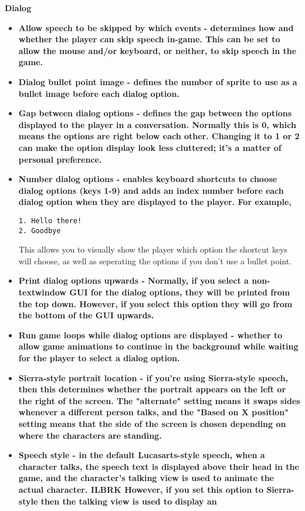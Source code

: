 \bf{Dialog}
\begin{itemize}
\item \bf{Allow speech to be skipped by which events} - determines how and whether the player can skip speech
in-game. This can be set to allow the mouse and/or keyboard, or neither, to
skip speech in the game.
\item \bf{Dialog bullet point image} - defines the number of sprite to use as a bullet image before each dialog option.
\item \bf{Gap between dialog options} - defines the gap between the options displayed
to the player in a conversation. Normally this is 0, which means the
options are right below each other. Changing it to 1 or 2 can make the
option display look less cluttered; it's a matter of personal preference.
\item \bf{Number dialog options} - enables keyboard shortcuts to choose dialog options (keys 1-9) and adds an index number before each dialog option when
they are displayed to the player. For example,
\begin{verbatim}
1. Hello there!
2. Goodbye
\end{verbatim}
This allows you to visually show the player which option the shortcut keys will choose,
as well as seperating the options if you don't use a bullet point.
\item \bf{Print dialog options upwards} - Normally, if you select a non-textwindow GUI
for the dialog options, they will be printed from the top down. However, if you select this
option they will go from the bottom of the GUI upwards.
\item \bf{Run game loops while dialog options are displayed} - whether to allow game animations to continue in the background while waiting for the player to select a dialog option.
\item \bf{Sierra-style portrait location} - if you're using Sierra-style speech, then this
determines whether the portrait appears on the left or the right of the screen. The "alternate"
setting means it swaps sides whenever a different person talks, and the "Based on X position"
setting means that the side of the screen is chosen depending on where the characters are
standing.
\item \bf{Speech style} - in the default Lucasarts-style speech, when a character talks, the
speech text is displayed above their head in the game, and the character's
talking view is used to animate the actual character. ILBRK
However, if you set this option to Sierra-style then the talking view is used to display an

\end{itemize}
